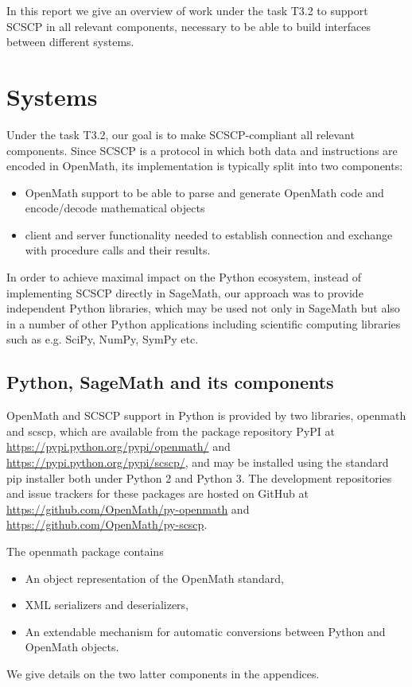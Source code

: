 \documentclass{deliverablereport}
\begin{document}
In this report we give an overview of work under the task T3.2 
to support SCSCP in all relevant components, necessary to be able
to build interfaces between different systems. 


\section{Systems}\label{systems}

Under the task T3.2, our goal is to make SCSCP-compliant all
relevant components. Since SCSCP is a protocol in which 
both data and instructions are encoded in OpenMath, its
implementation is typically split into two components: 
\begin{itemize}
\item OpenMath support to be able to parse and 
generate OpenMath code and encode/decode mathematical objects
\item client and server functionality needed to establish connection
and exchange with procedure calls and their results.
\end{itemize}

In order to achieve maximal impact on the Python ecosystem, 
instead of implementing SCSCP directly in SageMath, our approach
was to provide independent Python libraries, which may be used not
only in SageMath but also in a number of other Python applications
including scientific computing libraries such as e.g. 
SciPy, NumPy, SymPy etc.



\subsection{Python, SageMath and its components}

OpenMath and SCSCP support in Python is provided by two libraries,
{\sf openmath} and {\sf scscp}, which are available from the package
repository PyPI at \url{https://pypi.python.org/pypi/openmath/} and
\url{https://pypi.python.org/pypi/scscp/}, and may be installed using
the standard {\sf pip} installer both under Python 2 and Python 3. The
development repositories and issue trackers for these packages are
hosted on GitHub at \url{https://github.com/OpenMath/py-openmath} and
\url{https://github.com/OpenMath/py-scscp}.

The {\sf openmath} package contains
\begin{itemize}
\item An object representation of the OpenMath standard,
\item XML serializers and deserializers,
\item An extendable mechanism for automatic conversions between Python
  and OpenMath objects.
\end{itemize}
We give details on the two latter components in the appendices.
\end{document}
